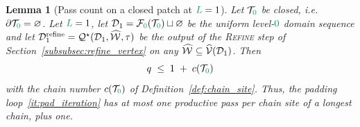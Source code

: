 \documentclass[a4paper, 12pt]{article}
\makeatletter
\newcommand{\quadriV}{\mathcal{Q}^{\star}}                       %
\newcommand{\quadriVup}[1]{\quadriV_{\rightarrow #1}}            %
\newcommand{\targetlevel}{\tau}                                 %
\newcommand{\green}{\color{ForestGreen}}
\newcommand{\T}{\mathcal{T}}
\newcommand{\V}{\mathcal{V}}
\newcommand{\F}{\mathcal{F}}
\newcommand{\vertexClasses}{\widehat{\V}}
\DeclareRobustCommand{\markedVertexClasses}[1][]{\widehat{\mathcal{W}}\ifx\@empty#1\@empty\else^{#1}\fi}
\renewcommand{\L}{{\green L}}
\newcommand{\lzero}{{\green 0}}
\newtheorem{lemma}[theorem]{Lemma}
\theoremstyle{definition}
\theoremstyle{plain}
\numberwithin{equation}{section}
\newcommand{\tobecut}[1]{{\color{red} #1}}     %
\DeclareRobustCommand{\domseq}[1][]{\mathcal{D}\ifx\@empty#1\@empty\else_{#1}\fi}
\makeatother
\begin{document}
\begin{lemma}[Pass count on a closed patch at $\L = 1$]
    \label{lemma:site_chain_bound}
    Let $\T_\lzero$ be closed, i.e. $\partial \T_\lzero = \varnothing$. Let $\L = 1$, let $\domseq[1] = \F_\lzero(\T_\lzero) \sqcup \varnothing$ be the uniform level-$\lzero$ domain sequence and let $\domseq[1]^{\mathrm{refine}} = \quadriV(\domseq[1], \markedVertexClasses, \targetlevel)$ be the output of the \textsc{Refine} step of Section~\ref{subsubsec:refine_vertex} on any $\markedVertexClasses \subseteq \vertexClasses(\domseq[1])$. Then
    \begin{equation}
        \label{eq:site_chain_bound}
        q \; \leq \; 1 \; + \; c(\T_\lzero)
    \end{equation}
    with the chain number $c(\T_\lzero)$ of Definition~\ref{def:chain_site}. Thus, the padding loop~\ref{it:pad_iteration} has at most one productive pass per chain site of a longest chain, plus one.
\end{lemma}
\end{document}
